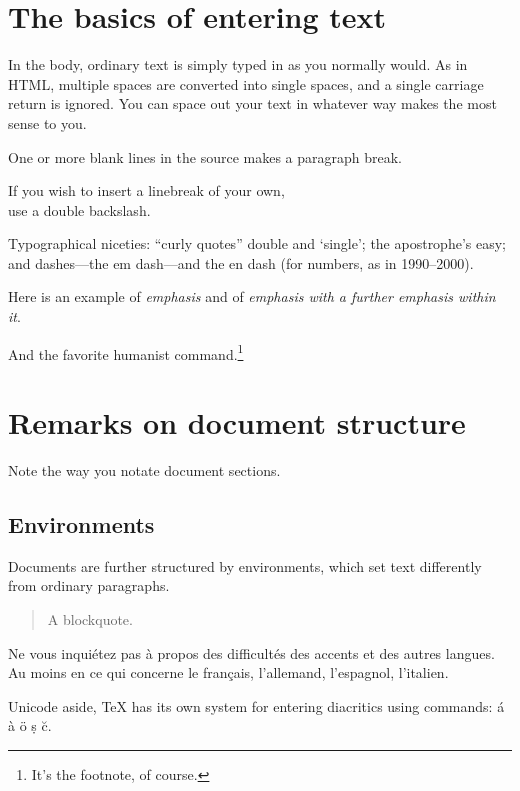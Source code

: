 \documentclass[12pt]{article}
\begin{document}
\section{The basics of entering text}

In the body, ordinary text is simply typed in as you normally would. As in HTML, multiple spaces are converted      into  single spaces, and
a single carriage return is
ignored. You can space out your text in whatever way makes the most sense to you.

One or more blank lines in the source makes a paragraph break. 

If you wish to insert a linebreak of your own, \\ use a double backslash.

Typographical niceties: ``curly quotes'' double and `single'; the apostrophe's easy; and dashes---the em dash---and the en dash (for numbers, as in 1990--2000).

Here is an example of \emph{emphasis} and of \emph{emphasis with a \emph{further} emphasis within it}.

And the favorite humanist command.\footnote{It's the footnote, of course.}

\section{Remarks on document structure}

Note the way you notate document sections.

\subsection{Environments}

Documents are further structured by environments, which set text differently from ordinary paragraphs.
\begin{quote}
A blockquote.
\end{quote}
Ne vous inquiétez pas à propos des difficultés des accents et des autres langues. Au moins en ce qui concerne le français, l'allemand, l'espagnol, l'italien. 

Unicode aside, TeX has its own system for entering diacritics using commands: \'a \`a \"o \d s \u c.

\end{document}
